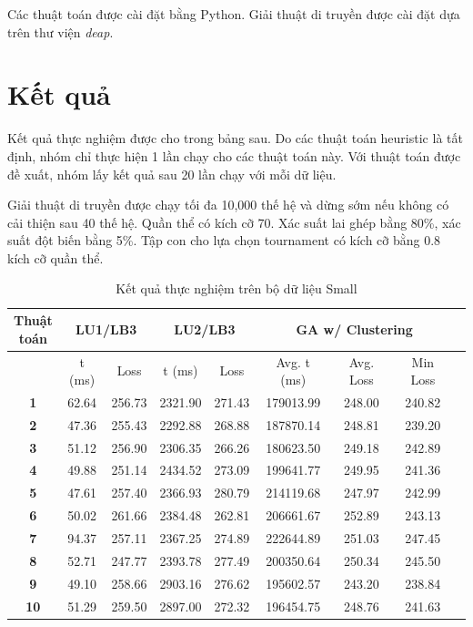 \documentclass[hidelinks, 11pt, a4paper]{report}
\begin{document}
Các thuật toán được cài đặt bằng Python. Giải thuật di truyền được cài đặt dựa trên thư viện \textit{deap}.

\section{Kết quả}
Kết quả thực nghiệm được cho trong bảng sau. Do các thuật toán heuristic là tất định, nhóm chỉ thực hiện 1 lần chạy cho các thuật toán này. Với thuật toán được đề xuất, nhóm lấy kết quả sau 20 lần chạy với mỗi dữ liệu.

Giải thuật di truyền được chạy tối đa 10,000 thế hệ và dừng sớm nếu không có cải thiện sau 40 thế hệ. Quần thể có kích cỡ 70. Xác suất lai ghép bằng 80\%, xác suất đột biến bằng 5\%. Tập con cho lựa chọn tournament có kích cỡ bằng 0.8 kích cỡ quần thể.

\begin{table}[]
\centering
\begin{tabular}{|c|c|c|c|c|c|c|c|c|}
\hline
\diagbox[width=6em]{Test}{Thuật\\toán} & \multicolumn{2}{c|}{\textbf{LU1/LB3}} & \multicolumn{2}{c|}{\textbf{LU2/LB3}} & \multicolumn{3}{c|}{\textbf{GA w/ Clustering}} \\ \hline
\multicolumn{1}{|l|}{}          & t (ms)         & Loss        & t (ms)           & Loss           & Avg. t (ms)  & Avg. Loss  & Min Loss \\ \hline
\textbf{1} & 62.64 & 256.73 & 2321.90 & 271.43 & 179013.99 & 248.00 & 240.82 \\ \hline
\textbf{2} & 47.36 & 255.43 & 2292.88 & 268.88 & 187870.14 & 248.81 & 239.20 \\ \hline
\textbf{3} & 51.12 & 256.90 & 2306.35 & 266.26 & 180623.50 & 249.18 & 242.89 \\ \hline
\textbf{4} & 49.88 & 251.14 & 2434.52 & 273.09 & 199641.77 & 249.95 & 241.36 \\ \hline
\textbf{5} & 47.61 & 257.40 & 2366.93 & 280.79 & 214119.68 & 247.97 & 242.99 \\ \hline
\textbf{6} & 50.02 & 261.66 & 2384.48 & 262.81 & 206661.67 & 252.89 & 243.13 \\ \hline
\textbf{7} & 94.37 & 257.11 & 2367.25 & 274.89 & 222644.89 & 251.03 & 247.45 \\ \hline
\textbf{8} & 52.71 & 247.77 & 2393.78 & 277.49 & 200350.64 & 250.34 & 245.50 \\ \hline
\textbf{9} & 49.10 & 258.66 & 2903.16 & 276.62 & 195602.57 & 243.20 & 238.84 \\ \hline
\textbf{10} & 51.29 & 259.50 & 2897.00 & 272.32 & 196454.75 & 248.76 & 241.63 \\ \hline
\end{tabular}
\caption{Kết quả thực nghiệm trên bộ dữ liệu Small}
\end{table}
\end{document}
